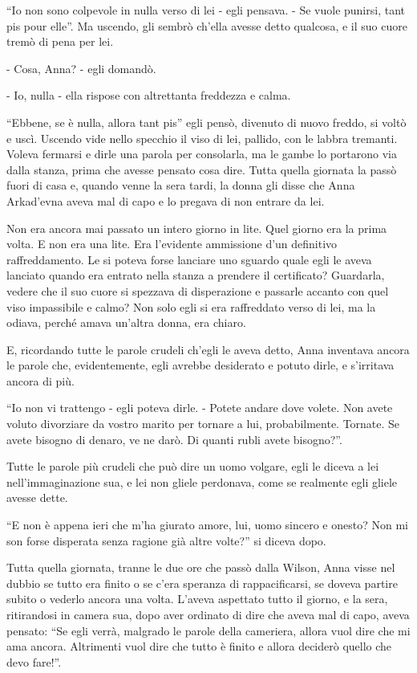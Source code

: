 ``Io non sono colpevole in nulla verso di lei - egli pensava. - Se vuole punirsi, tant pis pour elle''. Ma uscendo, gli sembrò ch'ella avesse detto qualcosa, e il suo cuore tremò di pena per lei. 

- Cosa, Anna? - egli domandò. 

- Io, nulla - ella rispose con altrettanta freddezza e calma. 

``Ebbene, se è nulla, allora tant pis'' egli pensò, divenuto di nuovo freddo, si voltò e uscì. Uscendo vide nello specchio il viso di lei, pallido, con le labbra tremanti. Voleva fermarsi e dirle una parola per consolarla, ma le gambe lo portarono via dalla stanza, prima che avesse pensato cosa dire. Tutta quella giornata la passò fuori di casa e, quando venne la sera tardi, la donna gli disse che Anna Arkad'evna aveva mal di capo e lo pregava di non entrare da lei. 

\label{xxvi-5} 

Non era ancora mai passato un intero giorno in lite. Quel giorno era la prima volta. E non era una lite. Era l'evidente ammissione d'un definitivo raffreddamento. Le si poteva forse lanciare uno sguardo quale egli le aveva lanciato quando era entrato nella stanza a prendere il certificato? Guardarla, vedere che il suo cuore si spezzava di disperazione e passarle accanto con quel viso impassibile e calmo? Non solo egli si era raffreddato verso di lei, ma la odiava, perché amava un'altra donna, era chiaro. 

E, ricordando tutte le parole crudeli ch'egli le aveva detto, Anna inventava ancora le parole che, evidentemente, egli avrebbe desiderato e potuto dirle, e s'irritava ancora di più. 

``Io non vi trattengo - egli poteva dirle. - Potete andare dove volete. Non avete voluto divorziare da vostro marito per tornare a lui, probabilmente. Tornate. Se avete bisogno di denaro, ve ne darò. Di quanti rubli avete bisogno?''. 

Tutte le parole più crudeli che può dire un uomo volgare, egli le diceva a lei nell'immaginazione sua, e lei non gliele perdonava, come se realmente egli gliele avesse dette. 

``E non è appena ieri che m'ha giurato amore, lui, uomo sincero e onesto? Non mi son forse disperata senza ragione già altre volte?'' si diceva dopo. 

Tutta quella giornata, tranne le due ore che passò dalla Wilson, Anna visse nel dubbio se tutto era finito o se c'era speranza di rappacificarsi, se doveva partire subito o vederlo ancora una volta. L'aveva aspettato tutto il giorno, e la sera, ritirandosi in camera sua, dopo aver ordinato di dire che aveva mal di capo, aveva pensato: ``Se egli verrà, malgrado le parole della cameriera, allora vuol dire che mi ama ancora. Altrimenti vuol dire che tutto è finito e allora deciderò quello che devo fare!''. 

